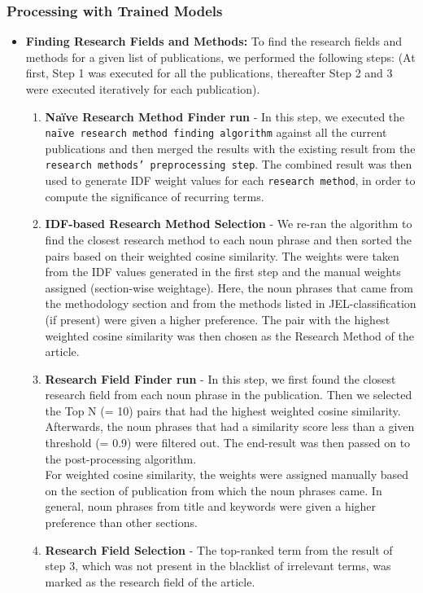 \documentclass[runningheads]{llncs}
\begin{document}
\subsubsection{Processing with Trained Models} 
\smallskip
\begin{itemize}
    \item \textbf{Finding Research Fields and Methods:} To find the research fields and methods for a given list of publications, we performed the following steps: (At first, Step 1 was executed for all the publications, thereafter Step 2 and 3 were executed iteratively for each publication).
\begin{enumerate}
    \item \textbf{Naïve Research Method Finder run} - In this step, we executed the \texttt{naïve research method finding algorithm} against all the current publications and then merged the results with the existing result from the \texttt{research methods' preprocessing step}. The combined result was then used to generate IDF weight values for each \texttt{research method}, in order to compute the significance of recurring terms.
    \smallskip
    \smallskip
    \item \textbf{IDF-based Research Method Selection} - %
    We re-ran the algorithm to find the closest research method to each noun phrase and then sorted the pairs based on their weighted cosine similarity. The weights were taken from the IDF values generated in the first step and the manual weights assigned (section-wise weightage). %
    Here, the noun phrases that came from the methodology section and from the methods listed in JEL-classification (if present) were given a higher preference. The pair with the highest weighted cosine similarity was then chosen as the Research Method of the article.
    \item \textbf{Research Field Finder run} - In this step, we first found the closest research field from each noun phrase in the publication. Then we selected the Top N (= 10) pairs that had the highest weighted cosine similarity. Afterwards, the noun phrases that had a similarity score less than a given threshold (= 0.9) were filtered out. The end-result was then passed on to the post-processing algorithm. \\ %
    For weighted cosine similarity, the weights were assigned manually based on the section of publication from which the noun phrases came. In general, noun phrases from title and keywords were given a higher preference than other sections.
    \smallskip
    \item \textbf{Research Field Selection} - The top-ranked term from the %
    result of step 3, which was not present in the blacklist of irrelevant terms, was marked as the research field of the article.
    \smallskip
\end{enumerate}
\end{itemize}
\end{document}
